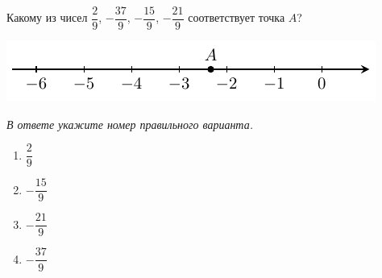 Какому из чисел $\dfrac{2}{9}$, $-\dfrac{37}{9}$, $-\dfrac{15}{9}$, $-\dfrac{21}{9}$ соответствует точка $A$?
\begin{center}
	\includegraphics{graphs/graph_4/graph_4}
\end{center}

\textit{В ответе укажите номер правильного варианта.}
\begin{multicols}{4}
	\begin{enumerate}[label=\arabic*)]
		\item $\dfrac{2}{9}$
		\item $-\dfrac{15}{9}$
		\item $-\dfrac{21}{9}$
		\item $-\dfrac{37}{9}$
	\end{enumerate}
\end{multicols}